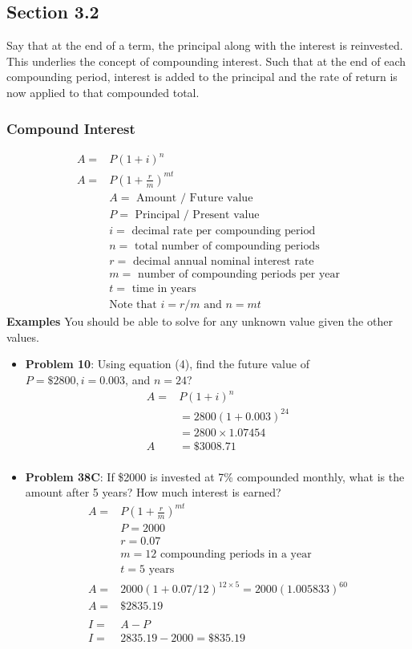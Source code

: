 \documentclass[14pt]{extarticle}
\begin{document}
\subsection{Section 3.2}
Say that at the end of a term, the principal along with the interest is reinvested. This underlies the concept of compounding interest. Such that at the end of each compounding period, interest is added to the principal and the rate of return is now applied to that compounded total.
\subsubsection*{Compound Interest}
\begin{align*}
	A = &P(1+i)^n \tag{4} \\
	A = &P\left(1+\frac{r}{m}\right)^{mt} \tag{5} \\
	&A = \text{ Amount / Future value} \\
	&P = \text{ Principal / Present value} \\
	&i = \text{ decimal rate per compounding period} \\
	&n = \text{ total number of compounding periods} \\
	&r = \text{ decimal annual nominal interest rate} \\
	&m = \text{ number of compounding periods per year} \\
	&t = \text{ time in years} \\
	&\text{Note that } i=r/m \text{ and } n= mt
\end{align*}
\textbf{Examples}
You should be able to solve for any unknown value given the other values.
\begin{itemize}
	\item \textbf{Problem 10}: Using equation (4), find the future value of $P=\$2800, i=0.003$, and $n=24$?
	\begin{align*}
		A = &P(1+i)^n \\
		&= 2800(1+0.003)^{24} \\
		&= 2800 \times 1.07454 \\
		A &= \$3008.71 \\
	\end{align*}
	\item \textbf{Problem 38C}: If \$2000 is invested at 7\% compounded monthly, what is the amount after 5 years? How much interest is earned?
	\begin{align*}
		A = &P\left(1+\frac{r}{m}\right)^{mt} \\
		&P =2000 \\
		&r = 0.07 \\
		&m = 12 \text{ compounding periods in a year} \\
		&t = 5 \text{ years} \\
		A = &2000(1+0.07/12)^{12 \times 5} 	= 2000(1.005833)^{60} \\
		A = &\$2835.19 \\\\
		I = &A-P \\
		I = &2835.19 - 2000 = \$835.19
	\end{align*}
\end{itemize}
\end{document}
